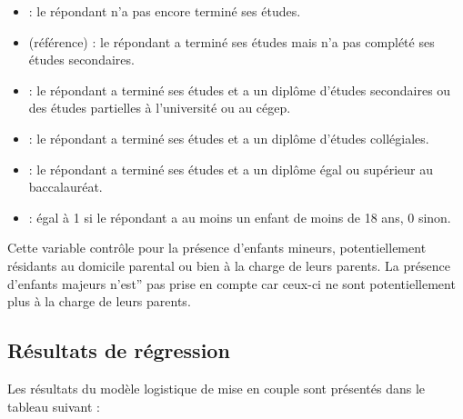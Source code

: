 \documentclass[letterpaper,10pt,french]{sphinxmanual}
\begin{document}
\begin{itemize}
\item {} 
 : le répondant n’a pas encore terminé ses études.

\item {} 
 (référence) : le répondant a terminé ses études mais n’a pas complété ses études secondaires.

\item {} 
 : le répondant a terminé ses études et a un diplôme d’études secondaires ou des études partielles à l’université ou au cégep.

\item {} 
 : le répondant a terminé ses études et a un diplôme d’études collégiales.

\item {} 
 : le répondant a terminé ses études et a un diplôme égal ou supérieur au baccalauréat.

\end{itemize}

\begin{itemize}
\item {} 
 : égal à 1 si le répondant a au moins un enfant de moins de 18 ans, 0 sinon.

\end{itemize}

Cette variable contrôle pour la présence d’enfants mineurs, potentiellement résidants au domicile parental ou bien à la charge de leurs parents. La présence d’enfants majeurs n’est” pas prise en compte car ceux-ci ne sont potentiellement plus à la charge de leurs parents.


\subsection{Résultats de régression}
\label{\detokenize{methodologie:id11}}
Les résultats du modèle logistique de mise en couple sont présentés dans le tableau suivant :
\end{document}
